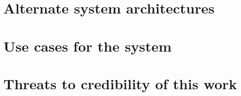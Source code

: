 \section{Alternate system architectures}\label{sec:altArchitectures}
\section{Use cases for the system}\label{sec:useCases}
\section{Threats to credibility of this work}\label{sec:threats}

